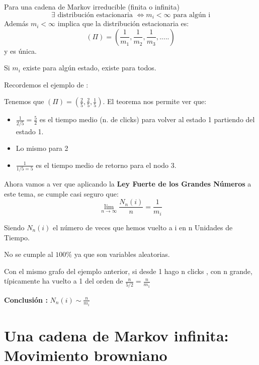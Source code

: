 	\begin{theorem}[Teorema 4]
		\label{Markov_tma4}
		Para una cadena de Markov irreducible (finita o infinita)
		$$\exists \text{ distribución estacionaria } \iff m_i <\infty \text{ para algún i}$$
		Además $m_i<\infty$ implica que la distribución estacionaria es:
		$$(\Pi) = \left(\frac{1}{m_1}, \frac{1}{m_2},\frac{1}{m_3}, .....\right)$$
		y es única.
	\end{theorem}
	\obs Si $m_i$ existe para algún estado, existe para todos.

	\begin{example}
		Recordemos el ejemplo de :
			\begin{center}
				\centering
			\end{center}

		Tenemos que $(\Pi) = (\frac{2}{5}, \frac{2}{5}, \frac{1}{5})$. El teorema nos permite ver que:
		\begin{itemize}
			\item $\frac{1}{2/5} = \frac{5}{2}$ es el tiempo medio (n. de clicks) para volver al estado 1 partiendo del estado 1.
			\item Lo mismo para 2
			\item $\frac{1}{1/5 = 5}$ es el tiempo medio de retorno para el nodo 3.
		\end{itemize}
	\end{example}

	Ahora vamos a ver que aplicando la \textbf{Ley Fuerte de los Grandes Números} a este tema, se cumple casi seguro que:
	$$\lim_{n \rightarrow \infty} \frac{N_n (i)}{n} = \frac{1}{m_i}$$

	Siendo $N_n (i)$ el número de veces que hemos vuelto a i en n Unidades de Tiempo.

	\obs No se cumple al $100\%$ ya que son variables aleatorias.

	\begin{example}
		Con el mismo grafo del ejemplo anterior, si desde 1 hago n clicks , con n grande, típicamente ha vuelto a 1 del orden de $\frac{n}{5/2} = \frac{n}{m_1}$
	\end{example}

	\textbf{Conclusión :} $N_n (i) \sim \frac{n}{m_i}$




\section{Una cadena de Markov infinita: Movimiento browniano}

